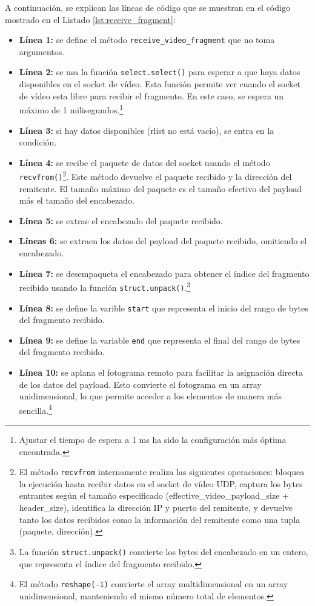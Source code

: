 A continuación, se explican las líneas de código que se muestran en el código mostrado en el Listado \ref{lst:receive_fragment}:
\begin{itemize}
    \item \textbf{Línea 1:} se define el método \texttt{receive\_video\_fragment} que no toma argumentos.
    \item \textbf{Línea 2:} se usa la función \texttt{select.select()} para esperar a que haya datos disponibles en el socket de vídeo. Esta función permite ver cuando el socket de vídeo esta libre para recibir el fragmento. En este caso, se espera un máximo de 1 milisegundos.\footnote{Ajustar el tiempo de espera a 1 ms ha sido la configuración más óptima encontrada.}
    \item \textbf{Línea 3:} si hay datos disponibles (rlist no está vacío), se entra en la condición.
    \item \textbf{Línea 4:} se recibe el paquete de datos del socket usando el método \texttt{recvfrom()}\footnote{El método \texttt{recvfrom} internamente realiza las siguientes operaciones: bloquea la ejecución hasta recibir datos en el socket de vídeo UDP, captura los bytes entrantes según el tamaño especificado (effective\_video\_payload\_size + header\_size), identifica la dirección IP y puerto del remitente, y devuelve tanto los datos recibidos como la información del remitente como una tupla (paquete, dirección).}. Este método devuelve el paquete recibido y la dirección del remitente. El tamaño máximo del paquete es el tamaño efectivo del payload más el tamaño del encabezado.
    \item \textbf{Línea 5:} se extrae el encabezado del paquete recibido.
    \item \textbf{Líneas 6:} se extraen los datos del payload del paquete recibido, omitiendo el encabezado.
    \item \textbf{Línea 7:} se desempaqueta el encabezado para obtener el índice del fragmento recibido usando la función \texttt{struct.unpack()}.\footnote{La función \texttt{struct.unpack()} convierte los bytes del encabezado en un entero, que representa el índice del fragmento recibido.}
    \item \textbf{Línea 8:} se define la varible \texttt{start} que representa el inicio del rango de bytes del fragmento recibido.
    \item \textbf{Línea 9:} se define la variable \texttt{end} que representa el final del rango de bytes del fragmento recibido.
    \item \textbf{Línea 10:} se aplana el fotograma remoto para facilitar la asignación directa de los datos del payload. Esto convierte el fotograma en un array unidimensional, lo que permite acceder a los elementos de manera más sencilla.\footnote{El método \texttt{reshape(-1)} convierte el array multidimensional en un array unidimensional, manteniendo el mismo número total de elementos.}

\end{itemize}
